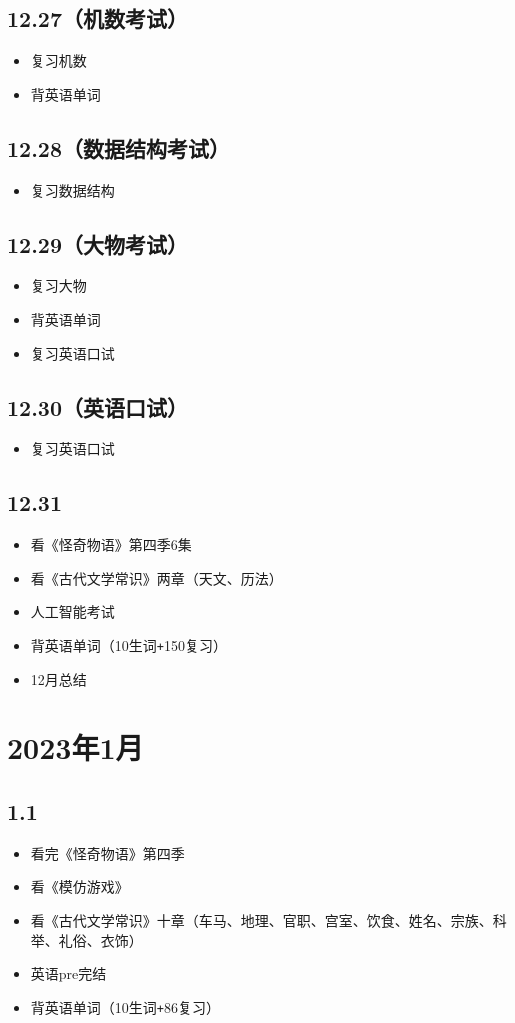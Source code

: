 \documentclass[UTF8]{ctexart}
\begin{document}
\subsection*{12.27（机数考试）}
\begin{itemize}
    \item 复习机数
    \item 背英语单词
\end{itemize}
\subsection*{12.28（数据结构考试）}
\begin{itemize}
    \item 复习数据结构
\end{itemize}
\subsection*{12.29（大物考试）}
\begin{itemize}
    \item 复习大物
    \item 背英语单词
    \item 复习英语口试
\end{itemize}
\subsection*{12.30（英语口试）}
\begin{itemize}
    \item 复习英语口试
\end{itemize}
\subsection*{12.31}
\begin{itemize}
    \item 看《怪奇物语》第四季6集
    \item 看《古代文学常识》两章（天文、历法）
    \item 人工智能考试
    \item 背英语单词（10生词\verb|+|150复习）
    \item 12月总结
\end{itemize}
\section*{2023年1月}
\subsection*{1.1}
\begin{itemize}
    \item 看完《怪奇物语》第四季
    \item 看《模仿游戏》
    \item 看《古代文学常识》十章（车马、地理、官职、宫室、饮食、姓名、宗族、科举、礼俗、衣饰）
    \item 英语pre完结
    \item 背英语单词（10生词\verb|+|86复习）
\end{itemize}
\end{document}
